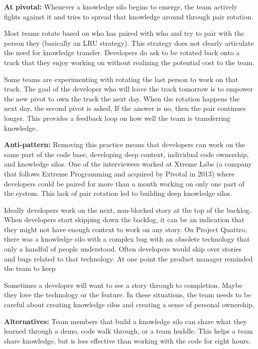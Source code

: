 \begin{table}[]
\textbf{At pivotal:} Whenever a knowledge silo begins to emerge, the team actively fights against it and tries to spread that knowledge around through pair rotation. 

Most teams rotate based on who has paired with who and try to pair with the person they  (basically an LRU strategy). This strategy does not clearly articulate the need for knowledge transfer. Developers do ask to be rotated back onto a track that they enjoy working on without realizing the potential cost to the team. 

Some teams are experimenting with rotating the last person to work on that track. The goal of the developer who will leave the track tomorrow is to empower the new pivot to own the track the next day. When the rotation happens the next day, the second pivot is asked,  If the answer is no, then the pair continues longer. This provides a feedback loop on how well the team is transferring knowledge.  

\textbf{Anti-pattern:} Removing this practice means that developers can work on the same part of the code base, developing deep context, individual code ownership, and knowledge silos. One of the interviewees worked at Xtreme Labs (a company that follows Extreme Programming and acquired by Pivotal in 2013) where developers could be paired for more than a month working on only one part of the system. This lack of pair rotation led to building deep knowledge silos. 

Ideally developers work on the next, non-blocked story at the top of the backlog. When developers start skipping down the backlog, it can be an indication that they might not have enough context to work on any story. On Project Quattro, there was a knowledge silo with a complex bug with an obsolete technology that only a handful of people understood. Often developers would skip over stories and bugs related to that technology. At one point the product manager reminded the team to keep  

Sometimes a developer will want to see a story through to completion. Maybe they love the technology or the feature. In these situations, the team needs to be careful about creating knowledge silos and creating a sense of personal ownership.

\textbf{Alternatives:} Team members that build a knowledge silo can share what they learned through a demo, code walk through, or a team huddle. This helps a team share knowledge, but is less effective than working with the code for eight hours. 


\end{table}
